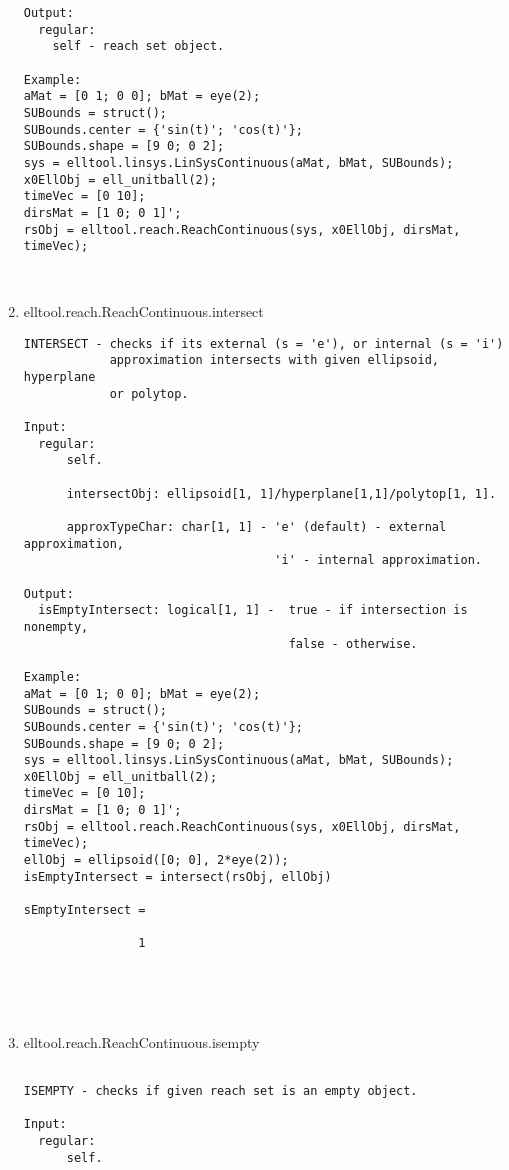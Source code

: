 \begin{enumerate}
\begin{lstlisting}
Output:
  regular:
    self - reach set object.

Example:
aMat = [0 1; 0 0]; bMat = eye(2);
SUBounds = struct();
SUBounds.center = {'sin(t)'; 'cos(t)'};
SUBounds.shape = [9 0; 0 2];
sys = elltool.linsys.LinSysContinuous(aMat, bMat, SUBounds);
x0EllObj = ell_unitball(2);
timeVec = [0 10];
dirsMat = [1 0; 0 1]';
rsObj = elltool.reach.ReachContinuous(sys, x0EllObj, dirsMat, timeVec);



\end{lstlisting}
\fontfamily{\familydefault}
\selectfont
\item {elltool.reach.ReachContinuous.intersect}
\selectfont
\begin{lstlisting}
INTERSECT - checks if its external (s = 'e'), or internal (s = 'i')
            approximation intersects with given ellipsoid, hyperplane
            or polytop.

Input:
  regular:
      self.

      intersectObj: ellipsoid[1, 1]/hyperplane[1,1]/polytop[1, 1].

      approxTypeChar: char[1, 1] - 'e' (default) - external approximation,
                                   'i' - internal approximation.

Output:
  isEmptyIntersect: logical[1, 1] -  true - if intersection is nonempty,
                                     false - otherwise.

Example:
aMat = [0 1; 0 0]; bMat = eye(2);
SUBounds = struct();
SUBounds.center = {'sin(t)'; 'cos(t)'};
SUBounds.shape = [9 0; 0 2];
sys = elltool.linsys.LinSysContinuous(aMat, bMat, SUBounds);
x0EllObj = ell_unitball(2);
timeVec = [0 10];
dirsMat = [1 0; 0 1]';
rsObj = elltool.reach.ReachContinuous(sys, x0EllObj, dirsMat, timeVec);
ellObj = ellipsoid([0; 0], 2*eye(2));
isEmptyIntersect = intersect(rsObj, ellObj)

sEmptyIntersect =

                1





\end{lstlisting}
\fontfamily{\familydefault}
\selectfont
\item {elltool.reach.ReachContinuous.isempty}
\selectfont
\begin{lstlisting}

ISEMPTY - checks if given reach set is an empty object.

Input:
  regular:
      self.


\end{lstlisting}
\end{enumerate}

